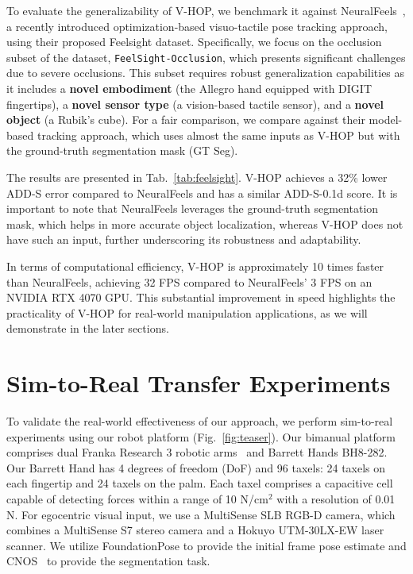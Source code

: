 \documentclass[11pt, a4paper, logo, twocolumn]{brown}
\newcommand{\shortname}{V-HOP\xspace}
\begin{document}
To evaluate the generalizability of \shortname, we benchmark it against NeuralFeels~\cite{suresh_neuralfeels_2024}, a recently introduced optimization-based visuo-tactile pose tracking approach, using their proposed Feelsight dataset.
Specifically, we focus on the occlusion subset of the dataset, \texttt{FeelSight-Occlusion}, which presents significant challenges due to severe occlusions. 
This subset requires robust generalization capabilities as it includes a \textbf{novel embodiment} (the Allegro hand equipped with DIGIT fingertips), a \textbf{novel sensor type} (a vision-based tactile sensor), and a \textbf{novel object} (a Rubik's cube).
For a fair comparison, we compare against their model-based tracking approach, which uses almost the same inputs as \shortname but with the ground-truth segmentation mask (GT Seg).

The results are presented in Tab.~\ref{tab:feelsight}. 
\shortname achieves a 32\% lower ADD-S error compared to NeuralFeels and has a similar ADD-S-0.1d score. 
It is important to note that NeuralFeels leverages the ground-truth segmentation mask, which helps in more accurate object localization, whereas \shortname does not have such an input, further underscoring its robustness and adaptability.

In terms of computational efficiency, \shortname is approximately 10 times faster than NeuralFeels, achieving 32 FPS compared to NeuralFeels’ 3 FPS on an NVIDIA RTX 4070 GPU.
This substantial improvement in speed highlights the practicality of \shortname for real-world manipulation applications, as we will demonstrate in the later sections.


\section{Sim-to-Real Transfer Experiments}

To validate the real-world effectiveness of our approach, we perform sim-to-real experiments using our robot platform (Fig.~\ref{fig:teaser}).
Our bimanual platform comprises dual Franka Research 3 robotic arms~\cite{haddadin_franka_2022} and Barrett Hands BH8-282. %
Our Barrett Hand has 4 degrees of freedom (DoF) and 96 taxels: 24 taxels on each fingertip and 24 taxels on the palm.
Each taxel comprises a capacitive cell capable of detecting forces within a range of 10 N/cm$^2$ with a resolution of 0.01 N.
For egocentric visual input, we use a MultiSense SLB RGB-D camera, %
which combines a MultiSense S7 stereo camera and a Hokuyo UTM-30LX-EW laser scanner.
We utilize FoundationPose to provide the initial frame pose estimate and CNOS~\cite{nguyen_cnos_2023, kirillov_segment_2023} to provide the segmentation task.
\end{document}
